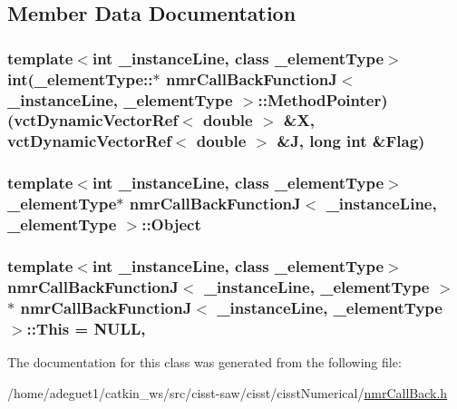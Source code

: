 \subsection{Member Data Documentation}
\hypertarget{classnmr_call_back_function_j_a519089e854d5d62ae3330d83e3a837ed}{
\subsubsection[{Method\-Pointer}]{\setlength{\rightskip}{0pt plus 5cm}template$<$int \-\_\-instance\-Line, class \-\_\-element\-Type$>$ int(\-\_\-element\-Type\-::$\ast$ {\bf nmr\-Call\-Back\-Function\-J}$<$ \-\_\-instance\-Line, \-\_\-element\-Type $>$\-::Method\-Pointer)({\bf vct\-Dynamic\-Vector\-Ref}$<$ double $>$ \&X, {\bf vct\-Dynamic\-Vector\-Ref}$<$ double $>$ \&J, long int \&Flag)\hspace{0.3cm}{\ttfamily [protected]}}}\label{classnmr_call_back_function_j_a519089e854d5d62ae3330d83e3a837ed}
\hypertarget{classnmr_call_back_function_j_a5c9d04ecebcf7162bdd42da632c59b7d}{
\subsubsection[{Object}]{\setlength{\rightskip}{0pt plus 5cm}template$<$int \-\_\-instance\-Line, class \-\_\-element\-Type$>$ \-\_\-element\-Type$\ast$ {\bf nmr\-Call\-Back\-Function\-J}$<$ \-\_\-instance\-Line, \-\_\-element\-Type $>$\-::Object\hspace{0.3cm}{\ttfamily [protected]}}}\label{classnmr_call_back_function_j_a5c9d04ecebcf7162bdd42da632c59b7d}
\hypertarget{classnmr_call_back_function_j_a5d6cc7cb52026f09dce7a569ad2e46ca}{
\subsubsection[{This}]{\setlength{\rightskip}{0pt plus 5cm}template$<$int \-\_\-instance\-Line, class \-\_\-element\-Type$>$ {\bf nmr\-Call\-Back\-Function\-J}$<$ \-\_\-instance\-Line, \-\_\-element\-Type $>$ $\ast$ {\bf nmr\-Call\-Back\-Function\-J}$<$ \-\_\-instance\-Line, \-\_\-element\-Type $>$\-::This = N\-U\-L\-L\hspace{0.3cm}{\ttfamily [static]}, {\ttfamily [protected]}}}\label{classnmr_call_back_function_j_a5d6cc7cb52026f09dce7a569ad2e46ca}


The documentation for this class was generated from the following file\-:\begin{DoxyCompactItemize}
\item 
/home/adeguet1/catkin\-\_\-ws/src/cisst-\/saw/cisst/cisst\-Numerical/\hyperlink{nmr_call_back_8h}{nmr\-Call\-Back.\-h}\end{DoxyCompactItemize}

